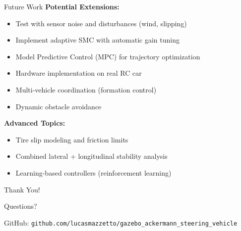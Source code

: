 \documentclass[10pt]{beamer}
\begin{document}
\begin{frame}{Future Work}
  \textbf{Potential Extensions:}
  \begin{itemize}
    \item Test with sensor noise and disturbances (wind, slipping)
    \item Implement adaptive SMC with automatic gain tuning
    \item Model Predictive Control (MPC) for trajectory optimization
    \item Hardware implementation on real RC car
    \item Multi-vehicle coordination (formation control)
    \item Dynamic obstacle avoidance
  \end{itemize}

  \vspace{0.5cm}

  \textbf{Advanced Topics:}
  \begin{itemize}
    \item Tire slip modeling and friction limits
    \item Combined lateral + longitudinal stability analysis
    \item Learning-based controllers (reinforcement learning)
  \end{itemize}
\end{frame}

\begin{frame}
  \centering
  \Huge Thank You!

  \vspace{1cm}

  \Large Questions?

  \vspace{1cm}

  \normalsize
  GitHub: \texttt{github.com/lucasmazzetto/gazebo\_ackermann\_steering\_vehicle}
\end{frame}

\appendix
\end{document}
